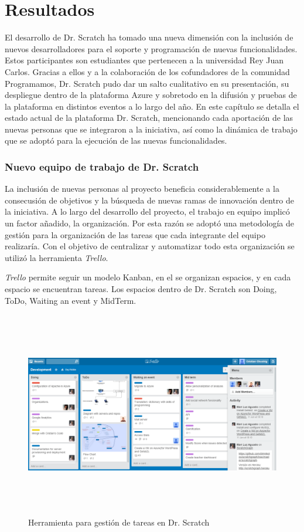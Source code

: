 \documentclass[a4paper, 12pt]{book}
\begin{document}
\cleardoublepage
\chapter{Resultados}

El desarrollo de Dr. Scratch ha tomado una nueva dimensión con la inclusión de nuevos 
desarrolladores para el soporte y programación de nuevas funcionalidades. Estos 
participantes son estudiantes que pertenecen a la universidad Rey Juan Carlos. Gracias
a ellos y a la colaboración de los cofundadores de la comunidad Programamos,
Dr. Scratch pudo dar un salto cualitativo en su presentación, su despliegue dentro 
de la plataforma Azure y sobretodo en la difusión y pruebas de la plataforma en 
distintos eventos a lo largo del año. En este capítulo se detalla el estado actual de 
la plataforma Dr. Scratch, mencionando cada aportación de las nuevas personas que se 
integraron a la iniciativa, así como la dinámica de trabajo que se adoptó para la 
ejecución de las nuevas funcionalidades.

\subsection{Nuevo equipo de trabajo de Dr. Scratch}

La inclusión de nuevas personas al proyecto beneficia considerablemente a la 
consecusión de objetivos y la búsqueda de nuevas ramas de innovación dentro de la
iniciativa. A lo largo del desarrollo del proyecto, el trabajo en equipo implicó
un factor añadido, la organización. Por esta razón se adoptó una metodología de 
gestión para la organización de las tareas que cada integrante del equipo realizaría. 
Con el objetivo de centralizar y automatizar todo esta organización se utilizó
la herramienta \emph{Trello}.  

\emph{Trello} permite seguir un modelo Kanban, en el se organizan espacios, y en
cada espacio se encuentran tareas. Los espacios dentro de Dr. Scratch son Doing, ToDo,
Waiting an event y MidTerm.

\begin{figure}
	\centering
	\graphicspath{{img/}}
  \includegraphics[bb=0 0 800 600, width=18cm, height=9cm, keepaspectratio]{trello.png}
	\caption{Herramienta para gestión de tareas en Dr. Scratch}
  \label{figura:foro_hilos}
\end{figure}
\end{document}
